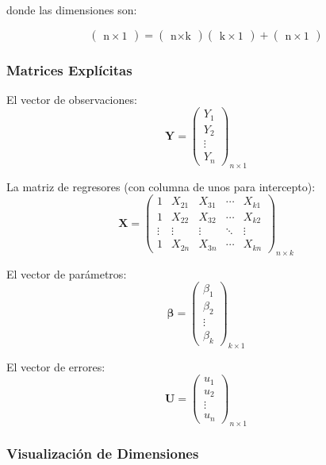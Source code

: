 \documentclass[11pt,a4paper]{article}
\begin{document}
donde las dimensiones son:
 
\[
\begin{pmatrix} \text{n} \times 1 \end{pmatrix} = \begin{pmatrix} \text{n} \times \text{k} \end{pmatrix} \begin{pmatrix} \text{k} \times 1 \end{pmatrix} + \begin{pmatrix} \text{n} \times 1 \end{pmatrix}
\]
 
\subsubsection*{Matrices Explícitas}
 
El vector de observaciones:
\[
\mathbf{Y} = \begin{pmatrix}
Y_1 \\ Y_2 \\ \vdots \\ Y_n
\end{pmatrix}_{n \times 1}
\]
 
La matriz de regresores (con columna de unos para intercepto):
\[
\mathbf{X} = \begin{pmatrix}
1 & X_{21} & X_{31} & \cdots & X_{k1} \\
1 & X_{22} & X_{32} & \cdots & X_{k2} \\
\vdots & \vdots & \vdots & \ddots & \vdots \\
1 & X_{2n} & X_{3n} & \cdots & X_{kn}
\end{pmatrix}_{n \times k}
\]
 
El vector de parámetros:
\[
\boldsymbol{\beta} = \begin{pmatrix}
\beta_1 \\ \beta_2 \\ \vdots \\ \beta_k
\end{pmatrix}_{k \times 1}
\]
 
El vector de errores:
\[
\mathbf{U} = \begin{pmatrix}
u_1 \\ u_2 \\ \vdots \\ u_n
\end{pmatrix}_{n \times 1}
\]
 
\subsubsection*{Visualización de Dimensiones}
 
\end{document}
